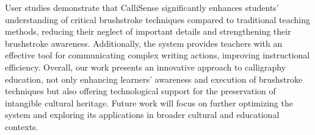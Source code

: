 User studies demonstrate that CalliSense significantly enhances students' understanding of critical brushstroke techniques compared to traditional teaching methods, reducing their neglect of important details and strengthening their brushstroke awareness. Additionally, the system provides teachers with an effective tool for communicating complex writing actions, improving instructional efficiency. Overall, our work presents an innovative approach to calligraphy education, not only enhancing learners' awareness and execution of brushstroke techniques but also offering technological support for the preservation of intangible cultural heritage. Future work will focus on further optimizing the system and exploring its applications in broader cultural and educational contexts.


